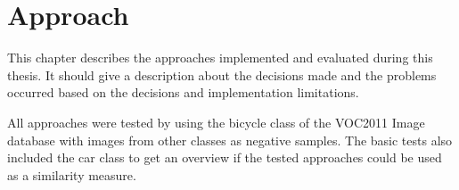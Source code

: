 \chapter{Approach}
\label{cha:work}

This chapter describes the approaches implemented and evaluated during this thesis. It should give a description about the decisions made and the problems occurred based on the decisions and implementation limitations.

All approaches were tested by using the bicycle class of the \ac{VOC2011} Image database \cite{Pascal2011} with images from other classes as negative samples. The basic tests also included the car class to get an overview if the tested approaches could be used as a similarity measure.















